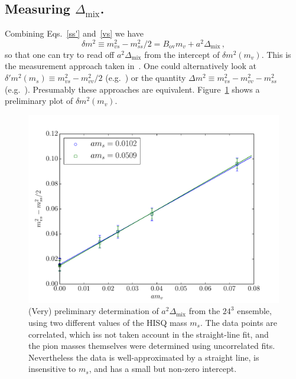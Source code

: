 \documentclass[11pt,a4paper]{article}
\newcommand{\Dmix}[0]{\Delta_{\text{mix}}}
\begin{document}
\subsection{Measuring $\Dmix$.}
Combining Eqs.~\eqref{ss'} and~\eqref{vs} we have
\begin{equation}
\delta m^2 \equiv m^2_{vs} - m^2_{ss}/2 = B_{\text{ov}} m_v + a^2 \Dmix \, ,
\end{equation}
so that one can try to read off $a^2 \Dmix$ from the intercept of $\delta m^2(m_v)$. 
This is the measurement approach taken in~\cite{Lujan:2012wg}.
One could alternatively look at 
$\delta' m^2(m_s)  \equiv m^2_{vs} - m^2_{vv}/2$ (e.g.~\cite{Aubin:2008wk})
or the quantity $\Delta m^2 \equiv m^2_{vs} - m^2_{vv} - m^2_{ss}$ (e.g.~\cite{Orginos:2007tw}).
Presumably these approaches are equivalent.  
Figure~\ref{fig:delta_msq} shows a preliminary plot of $\delta m^2(m_v)$.
\begin{figure}
\centering
\includegraphics[width=\textwidth]{delta_msq.pdf}
\caption{(Very) preliminary determination of $a^2 \Dmix$ from the $24^3$ ensemble, using
two different values of the HISQ mass $m_s$. The data points are correlated, which
iss not taken account in the straight-line fit, and the pion masses themselves were determined
using uncorrelated fits.  Nevertheless the data is well-approximated by a straight line, is
insensitive to $m_s$, and has a small but non-zero intercept.} 
\label{fig:delta_msq}
\end{figure}
\end{document}
